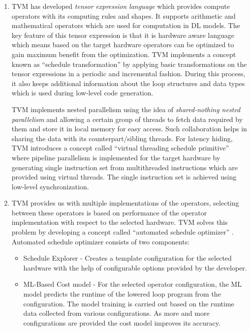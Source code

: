 \begin{enumerate}
  \item TVM has developed \textit{tensor expression language} which provides compute operators with its computing rules and shapes. It supports arithmetic and mathematical operators which are used for computation in DL models. The key feature of this tensor expression is that it is hardware aware language which means based on the target hardware operators can be optimized to gain maximum benefit from the optimization. TVM implements a concept known as “schedule transformation” \cite{tvm_fig} by applying basic transformations on the tensor expressions in a periodic and incremental fashion. During this process, it also keeps additional information about the loop structures and data types which is used during low-level code generation.
  
  TVM implements nested parallelism using the idea of \textit{shared-nothing nested parallelism} and allowing a certain group of threads to fetch data required by them and store it in local memory for easy access. Such collaboration helps in sharing the data with its counterpart/sibling threads. For latency hiding, TVM introduces a concept called “virtual threading schedule primitive” \cite{tvm_fig} where pipeline parallelism is implemented for the target hardware by generating single instruction set from multithreaded instructions which are provided using virtual threads. The single instruction set is achieved using low-level synchronization.
  
  \item  TVM provides us with multiple implementations of the operators, selecting between these operators is based on performance of the operator implementation with respect to the selected hardware. TVM solves this problem by developing a concept called “automated schedule optimizer” \cite{tvm_fig}.
Automated schedule optimizer consists of two components:

\begin{itemize}
     \item Schedule Explorer - Creates a template configuration for the selected hardware with the help of configurable options provided by the developer.
     \item ML-Based Cost model - For the selected operator configuration, the ML model predicts the runtime of the lowered loop program from the configuration. The model training is carried out based on the runtime data collected from various configurations. As more and more configurations are provided the cost model improves its accuracy.
   \end{itemize}
\end{enumerate}


